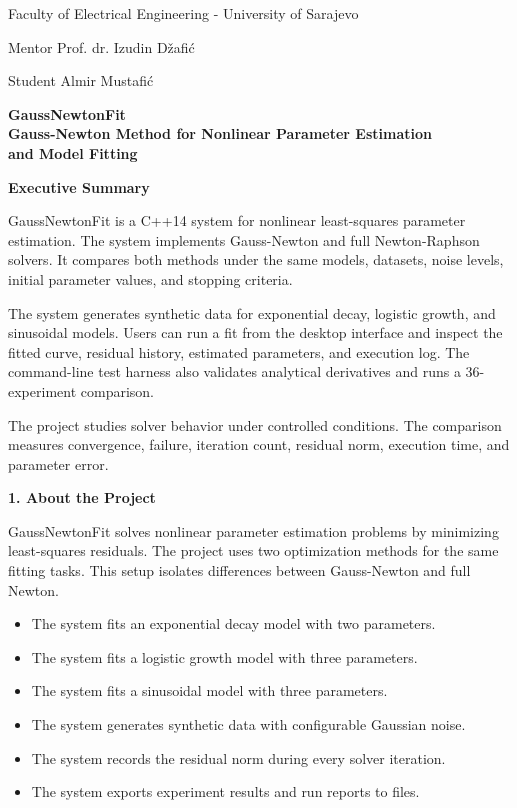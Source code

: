 \documentclass[9pt,a4paper]{extarticle}
\newcommand{\Sec}[1]{\vspace{2pt}\noindent\textbf{#1}\par\vspace{2pt}}
\begin{document}
\fontsize{8.6}{10.2}\selectfont

Faculty of Electrical Engineering - University of Sarajevo

Mentor Prof. dr. Izudin Džafić

Student Almir Mustafić

\vfill
\begin{center}
{\fontsize{17}{20}\selectfont\textbf{GaussNewtonFit}}\\[8pt]
{\fontsize{11.5}{14}\selectfont\textbf{Gauss-Newton Method for Nonlinear Parameter Estimation}}\\[2pt]
{\fontsize{11.5}{14}\selectfont\textbf{and Model Fitting}}
\end{center}
\vfill
\newpage

\Sec{Executive Summary}
GaussNewtonFit is a C++14 system for nonlinear least-squares parameter estimation. The system implements Gauss\mbox{-}Newton and full Newton-Raphson solvers. It compares both methods under the same models, datasets, noise levels, initial parameter values, and stopping criteria.

The system generates synthetic data for exponential decay, logistic growth, and sinusoidal models. Users can run a fit from the desktop interface and inspect the fitted curve, residual history, estimated parameters, and execution log. The \mbox{command-line} test harness also validates analytical derivatives and runs a 36-experiment comparison.

The project studies solver behavior under controlled conditions. The comparison measures convergence, failure, iteration count, residual norm, execution time, and parameter error.

\Sec{1. About the Project}
GaussNewtonFit solves nonlinear parameter estimation problems by minimizing least-squares residuals. The project uses two optimization methods for the same fitting tasks. This setup isolates differences between Gauss-Newton and full Newton.
\begin{itemize}
\item The system fits an exponential decay model with two parameters.
\item The system fits a logistic growth model with three parameters.
\item The system fits a sinusoidal model with three parameters.
\item The system generates synthetic data with configurable Gaussian noise.
\item The system records the residual norm during every solver iteration.
\item The system exports experiment results and run reports to files.
\end{itemize}
\newpage
\end{document}
